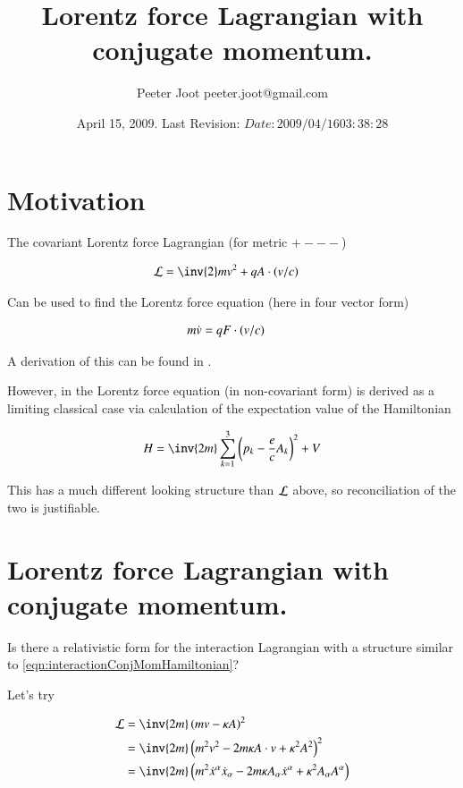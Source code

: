 \documentclass{article}
\title{ Lorentz force Lagrangian with conjugate momentum. }
\author{Peeter Joot \quad peeter.joot@gmail.com }
\date{ April 15, 2009.  Last Revision: $Date: 2009/04/16 03:38:28 $ }
\begin{document}
\maketitle{}

\section{ Motivation }

The covariant Lorentz force Lagrangian (for metric $+---$)

\begin{align}
\LL &= \inv{2} m v^2 + q A \cdot (v/c)
\end{align}

Can be used to find the Lorentz force equation (here in four vector form)

\begin{align}
m\dot{v} &= q F \cdot (v/c)
\end{align}

A derivation of this can be found in \cite{PJSrLorentzForce}.

However, in
\cite{pauli2000wm} the Lorentz force equation (in non-covariant form) is
derived as a limiting classical case via calculation of the expectation
value of the Hamiltonian

\begin{align}\label{eqn:interactionConjMomHamiltonian}
H = \inv{2m}\sum_{k=1}^3 \left(p_k - \frac{e}{c} A_k \right)^2 + V
\end{align}

This has a much different looking structure than $\mathcal{L}$ above, so reconciliation of the two
is justifiable.

\section{ Lorentz force Lagrangian with conjugate momentum. }

Is there a relativistic form for the interaction Lagrangian with a structure similar to \ref{eqn:interactionConjMomHamiltonian}?

Let's try

\begin{align*}
\LL
&= \inv{2 m}\left( m v - \kappa A \right)^2 \\
&= \inv{2 m}\left( m^2 v^2 - 2 m \kappa A \cdot v + \kappa^2 A^2 \right)^2 \\
&= \inv{2 m} \left(
m^2 \xdot^\alpha \xdot_\alpha
- 2 m \kappa A_\alpha \xdot^\alpha
+ \kappa^2 A_\alpha A^\alpha
\right) \\
\end{align*}
\end{document}

